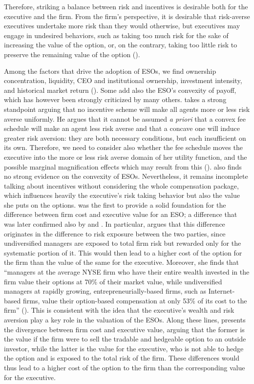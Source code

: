     Therefore, striking a balance between risk and incentives is desirable both for the executive and the firm. From the firm’s perspective, it is desirable that risk-averse executives undertake more risk than they would otherwise, but executives may engage in undesired behaviors, such as taking too much risk for the sake of increasing the value of the option, or, on the contrary, taking too little risk to preserve the remaining value of the option (\cite{grinblatt1989adverse}).

    Among the factors that drive the adoption of ESOs, we find ownership concentration, liquidity, CEO and institutional ownership, investment intensity, and historical market return (\cite{pasternack2002factors}). Some add also the ESO's convexity of payoff, which has however been strongly criticized by many others. \cite{ross2004compensation} takes a strong standpoint arguing that no incentive scheme will make all agents more or less risk averse uniformly. He argues that it cannot be assumed \textit{a priori} that a convex fee schedule will make an agent less risk averse and that a concave one will induce greater risk aversion: they are both necessary conditions, but each insufficient on its own. Therefore, we need to consider also whether the fee schedule moves the executive into the more or less risk averse domain of her utility function, and the possible marginal magnification effects which may result from this (\cite{ross2004compensation}). \cite{hayes2012stock} also finds no strong evidence on the convexity of ESOs. 
    Nevertheless, it remains incomplete talking about incentives without considering the whole compensation package, which influences heavily the executive's risk taking behavior but also the value she puts on the options. \cite{carpenter1998exercise} was the first to provide a solid foundation for the difference between firm cost and executive value for an ESO; a difference that was later confirmed also by \cite{meulbroek2001efficiency} and \cite{hall2003trouble}. In particular, \cite{meulbroek2001efficiency} argues that this difference originates in the difference to risk exposure between the two parties, since undiversified managers are exposed to total firm risk but rewarded only for the systematic portion of it. This would then lead to a higher cost of the option for the firm than the value of the same for the executive. Moreover, she finds that ``managers at the average NYSE firm who have their entire wealth invested in the firm value their options at 70\% of their market value, while undiversified managers at rapidly growing, entrepreneurially-based firms, such as Internet-based firms, value their option-based compensation at only 53\% of its cost to the firm'' (\cite{meulbroek2001efficiency}). This is consistent with the idea that the executive's wealth and risk aversion play a key role in the valuation of the ESOs. Along these lines, \cite{hall2002stock} presents the divergence between firm cost and executive value, arguing that the former is the value if the firm were to sell the tradable and hedgeable option to an outside investor, while the latter is the value for the executive, who is not able to hedge the option and is exposed to the total risk of the firm. These differences would thus lead to a higher cost of the option to the firm than the corresponding value for the executive.
